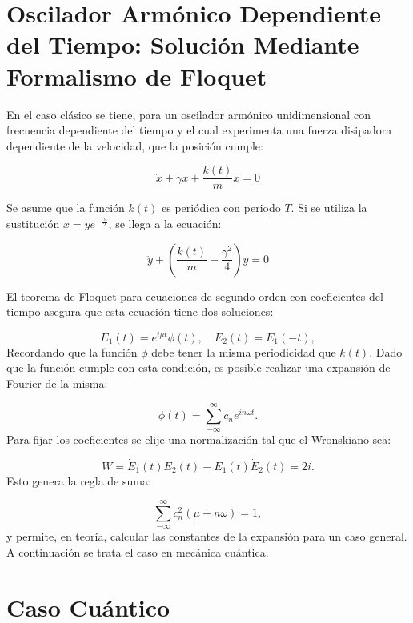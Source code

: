 \documentclass[a4paper,10pt]{report}
\begin{document}
\section{Oscilador Armónico Dependiente del Tiempo: Solución Mediante Formalismo de Floquet}

En el caso clásico \cite{HanngiFM} se tiene, para un oscilador armónico unidimensional con frecuencia dependiente del tiempo y el cual experimenta una fuerza disipadora dependiente de la velocidad, que la posición cumple:

\begin{equation}
\ddot{x}+\gamma\dot{x}+\frac{k(t)}{m}x=0
\end{equation}

Se asume que la función $k(t)$ es periódica con periodo $T$. Si se utiliza la sustitución $x=ye^{-\frac{\gamma t}{2}}$, se llega a la ecuación:

\begin{equation}
\ddot{y} +(\frac{k(t)}{m}-\frac{\gamma^2}{4})y=0
\end{equation}

El teorema de Floquet para ecuaciones de segundo orden con coeficientes del tiempo \cite{HanngiFM} asegura que esta ecuación tiene dos soluciones:

\begin{equation}
E_1(t) = e^{i\mu t}\phi(t), \quad E_2(t)=E_1(-t),
\end{equation} Recordando que la función $\phi$ debe tener la misma periodicidad que $k(t)$. Dado que la función cumple con esta condición, es posible realizar una expansión de Fourier \cite{ArfkenMM} de la misma:

\begin{equation}
\phi(t) = \sum_{-\infty}^\infty c_n e^{in\omega t}.
\end{equation} Para fijar los coeficientes se elije una normalización tal que el Wronskiano sea:

\begin{equation}
W = \dot{E}_1(t)E_2(t)-E_1(t)\dot{E}_2(t) = 2i.
\end{equation}Esto genera la regla de suma:

\begin{equation}
\sum_{-\infty}^\infty c_n^2(\mu + n\omega) = 1,
\end{equation} y permite, en teoría, calcular las constantes de la expansión para un caso general. A continuación se trata el caso en mecánica cuántica.

\section{Caso Cuántico}
\end{document}
